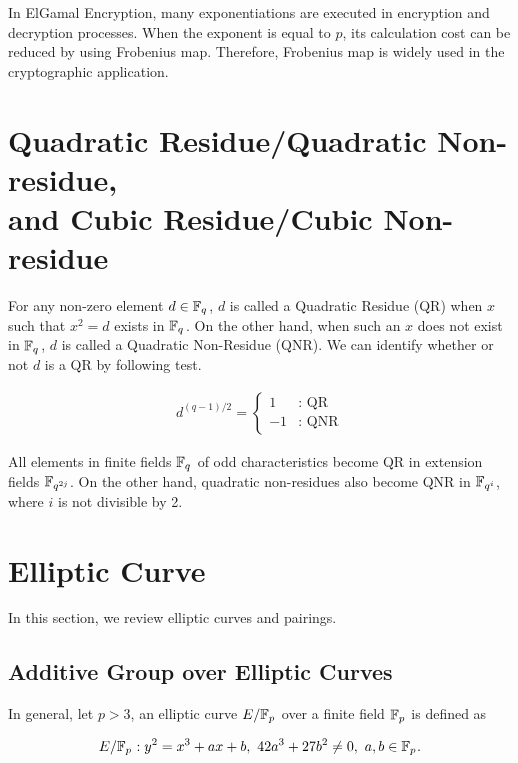 In ElGamal Encryption, many exponentiations are executed in encryption and decryption processes.
When the exponent is equal to $p$, its calculation cost can be reduced by using Frobenius map.
Therefore, Frobenius map is widely used in the cryptographic application.     

\section{Quadratic Residue/Quadratic Non-residue, \\and Cubic Residue/Cubic Non-residue}
\label{sec:chap:fund:qrqnr}

For any non-zero element $d\in{\mathbb{F}}_{q^{}}$, $d$ is called a Quadratic Residue (QR) when $x$ such that $x^2=d$ exists in ${\mathbb{F}}_{q^{}}$.
On the other hand, when such an $x$ does not exist in ${\mathbb{F}}_{q^{}}$, $d$ is called a Quadratic Non-Residue (QNR).
We can identify whether or not $d$ is a QR by following test.

\begin{eqnarray}
d^{(q-1)/2} = \left\{
\begin{array}{ll}
1 & \mbox{: QR} \\
-1 & \mbox{: QNR} 
\end{array}
\right.
\end{eqnarray}

All elements in finite fields ${\mathbb{F}}_{q^{}}$ of odd characteristics become QR in extension fields ${\mathbb{F}}_{q^{2j}}$.
On the other hand, quadratic non-residues also become QNR in ${\mathbb{F}}_{q^{i}}$, where $i$ is not divisible by 2.


\section{Elliptic Curve}
\label{sec:chap:fund:ecc}
In this section, we review elliptic curves and pairings. 

\subsection{Additive Group over Elliptic Curves}

In general, let $p>3$, an elliptic curve $E/{\mathbb{F}}_{p^{}}$ over a finite field ${\mathbb{F}}_{p^{}}$ is defined as 

\begin{equation}
E/{\mathbb{F}}_{p^{}}: y^2=x^3+ax+b,\ 42a^3+27b^2 \neq 0,\ a,b\in {\mathbb{F}}_{p^{}}. \label{EC}
\end{equation}


